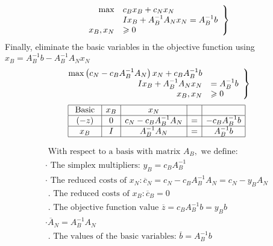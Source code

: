 \documentclass{article}
\begin{document}
$$
\left.\begin{array} { r l } { \max } & { c _ { B } x _ { B } + c _ { N } x _ { N } } \\ { } & { I x _ { B } + A _ { B } ^ { - 1 } A _ { N } x _ { N } = A _ { B } ^ { - 1 } b } \\ { x _ { B } , x _ { N } } & { \geqslant 0 } \end{array} \right\}
$$
Finally, eliminate the basic variables in the objective function
using $x _ { B } = A _ { B } ^ { - 1 } b - A _ { B } ^ { - 1 } A _ { N } x _ { N }$
$$
\left.\begin{array} { r l } { \max \left( c _ { N } - c _ { B } A _ { B } ^ { - 1 } A _ { N } \right) x _ { N } + c _ { B } A _ { B } ^ { - 1 } b } & { } \\ { I x _ { B } + A _ { B } ^ { - 1 } A _ { N } x _ { N } } & { = A _ { B } ^ { - 1 } b } \\ { x _ { B } , x _ { N } } & { \geqslant 0 } \end{array} \right\}
$$
$$
\begin{array} { | c | c | c | c | c| } \hline \text { Basic } & { x _ { B } } & { x _ { N } }&& \\ \hline ( - z ) & { 0 } & { c _ { N } - c _ { B } A _ { B } ^ { - 1 } A _ { N } } & { =}&{ - c _ { B } A _ { B } ^ { - 1 } b } \\ \hline x _ { B } & { I } & { A _ { B } ^ { - 1 } A _ { N } } & { = } & { A _ { B } ^ { - 1 } b } \\ \hline \end{array}
  $$

  $$
\begin{array} { l } { \text { With respect to a basis with matrix } A _ { B } , \text { we define: } } \\ { \cdot \text { The simplex multipliers: } y _ { B } = c _ { B } A _ { B } ^ { - 1 } } \\ { \cdot \text { The reduced costs of } x _ { N } : \overline { c } _ { N } = c _ { N } - c _ { B } A _ { B } ^ { - 1 } A _ { N } = c _ { N } - y _ { B } A _ { N } } \\ { \text { . The reduced costs of } x _ { B } : \overline { c } _ { B } = 0 } \\ { \text { . The objective function value } \overline { z } = c _ { B } A _ { B } ^ { - 1 } b = y _ { B } b } \\ { \cdot \overline { A } _ { N } = A _ { B } ^ { - 1 } A _ { N } } \\ { \text { . The values of the basic variables: } \overline { b } = A _ { B } ^ { - 1 } b } \end{array}
$$
\end{document}
